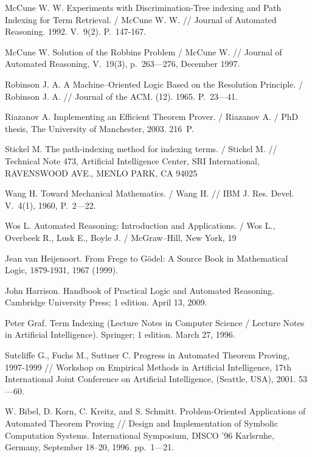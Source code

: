 \begin{thebibliography}{99}
 McCune W. W. Experiments with Discrimination-Tree indexing and Path Indexing for Term Retrieval. / McCune W. W. // Journal of Automated Reasoning. 1992. V.~9(2). P.~147-167.

 McCune W. Solution of the Robbins Problem / McCune W. // Journal of Automated Reasoning, V.~19(3), p.~263---276, December 1997.

 Robinson J. A. A Machine--Oriented Logic Based on the Resolution Principle. / Robinson J. A. //  Journal of the ACM. (12). 1965. P.~23---41.

 Riazanov A. Implementing an Efficient Theorem Prover. / Riazanov A. /  PhD thesis, The University of Manchester, 2003. 216~P.

 Stickel M. The path-indexing method for indexing terms. / Stickel M. // Technical Note 473, Artificial Intelligence Center, SRI International, RAVENSWOOD AVE., MENLO PARK, CA 94025

 Wang H. Toward Mechanical Mathematics. / Wang H. // IBM J. Res. Devel. V.~4(1), 1960, P.~2---22.

 Wos L. Automated Reasoning: Introduction and Applications. / Wos L., Overbeek R., Lusk E.,  Boyle J. / McGraw--Hill,  New York, 19

 Jean van Heijenoort. From Frege to Gödel: A Source Book in Mathematical Logic, 1879-1931, 1967 (1999).

 John Harrison. Handbook of Practical Logic and Automated Reasoning. Cambridge University Press; 1 edition. April 13, 2009.

 Peter Graf. Term Indexing (Lecture Notes in Computer Science / Lecture Notes in Artificial Intelligence). Springer; 1 edition. March 27, 1996.


 Sutcliffe G., Fuchs M., Suttner C. Progress in Automated Theorem Proving, 1997-1999 // Workshop on Empirical Methods in Artificial Intelligence, 17th International Joint Conference on Artificial Intelligence, (Seattle, USA), 2001. 53---60.


 W. Bibel, D. Korn, C. Kreitz, and S. Schmitt. Problem-Oriented Applications of Automated Theorem Proving // Design and Implementation of Symbolic Computation Systems. International Symposium, DISCO '96 Karlsruhe, Germany, September 18–20, 1996. pp.~1---21. 


\end{thebibliography}
